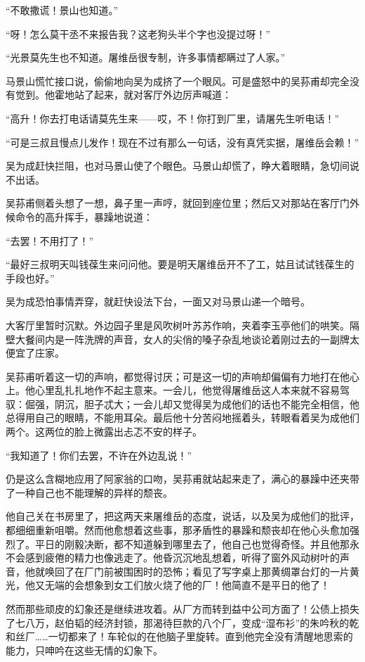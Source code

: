 \par “不敢撒谎！景山也知道。”
\par “呀！怎么莫干丞不来报告我？这老狗头半个字也没提过呀！”
\par “光景莫先生也不知道。屠维岳很专制，许多事情都瞒过了人家。”
\par 马景山慌忙接口说，偷偷地向吴为成挤了一个眼风。可是盛怒中的吴荪甫却完全没有觉到。他霍地站了起来，就对客厅外边厉声喊道：
\par “高升！你去打电话请莫先生来——哎，不！你打到厂里，请屠先生听电话！”
\par “可是三叔且慢点儿发作！现在不过有那么一句话，没有真凭实据，屠维岳会赖！”
\par 吴为成赶快拦阻，也对马景山使了个眼色。马景山却慌了，睁大着眼睛，急切间说不出话。
\par 吴荪甫侧着头想了一想，鼻子里一声哼，就回到座位里；然后又对那站在客厅门外候命令的高升挥手，暴躁地说道：
\par “去罢！不用打了！”
\par “最好三叔明天叫钱葆生来问问他。要是明天屠维岳开不了工，姑且试试钱葆生的手段也好。”
\par 吴为成恐怕事情弄穿，就赶快设法下台，一面又对马景山递一个暗号。
\par 大客厅里暂时沉默。外边园子里是风吹树叶苏苏作响，夹着李玉亭他们的哄笑。隔壁大餐间内是一阵洗牌的声音，女人的尖俏的嗓子杂乱地谈论着刚过去的一副牌太便宜了庄家。
\par 吴荪甫听着这一切的声响，都觉得讨厌；可是这一切的声响却偏偏有力地打在他心上。他心里乱扎扎地作不起主意来。一会儿，他觉得屠维岳这人本来就不容易驾驭：倔强，阴沉，胆子忒大；一会儿却又觉得吴为成他们的话也不能完全相信，他总得用自己的眼睛，不能用耳朵。最后他十分苦闷地摇着头，转眼看着吴为成他们两个。这两位的脸上微露出忐忑不安的样子。
\par “我知道了！你们去罢，不许在外边乱说！”
\par 仍是这么含糊地应用了阿家翁的口吻，吴荪甫就站起来走了，满心的暴躁中还夹带了一种自己也不能理解的异样的颓丧。
\par 他自己关在书房里了，把这两天来屠维岳的态度，说话，以及吴为成他们的批评，都细细重新咀嚼。然而他愈想着这些事，那矛盾性的暴躁和颓丧却在他心头愈加强烈了。平日的刚毅决断，都不知道躲到哪里去了，他自己也觉得奇怪。并且他那永不会感到疲倦的精力也像逃走了。他昏沉沉地乱想着，听得了窗外风动树叶的声音，他就唤回了在厂门前被围困时的恐怖；看见了写字桌上那黄绸罩台灯的一片黄光，他又无端的会想象到女工们放火烧了他的厂！他简直不是平日的他了！
\par 然而那些顽皮的幻象还是继续进攻着。从厂方而转到益中公司方面了！公债上损失了七八万，赵伯韬的经济封锁，那渴待巨款的八个厂，变成“湿布衫”的朱吟秋的乾和丝厂……一切都来了！车轮似的在他脑子里旋转。直到他完全没有清醒地思索的能力，只呻吟在这些无情的幻象下。
